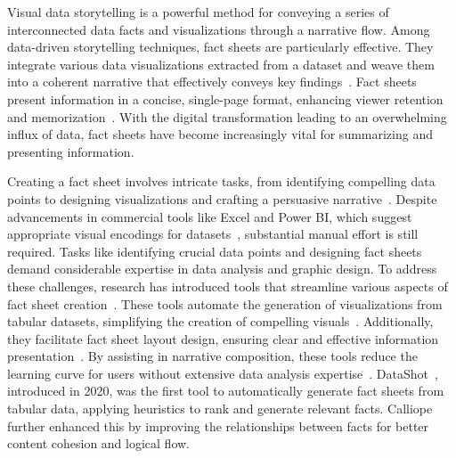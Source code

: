 
\maketitle

Visual data storytelling is a powerful method for conveying a series of interconnected data facts and visualizations through a narrative flow. Among data-driven storytelling techniques, fact sheets are particularly effective. They integrate various data visualizations extracted from a dataset and weave them into a coherent narrative that effectively conveys key findings~\cite{shi2020calliope}. Fact sheets present information in a concise, single-page format, enhancing viewer retention and memorization~\cite{wang2019datashot}. With the digital transformation leading to an overwhelming influx of data, fact sheets have become increasingly vital for summarizing and presenting information.
 

Creating a fact sheet involves intricate tasks, from identifying compelling data points to designing visualizations and crafting a persuasive narrative~\cite{ryan2018visual}. Despite advancements in commercial tools like Excel and Power BI, which suggest appropriate visual encodings for datasets~\cite{becker2019microsoft}, substantial manual effort is still required. Tasks like identifying crucial data points and designing fact sheets demand considerable expertise in data analysis and graphic design. To address these challenges, research has introduced tools that streamline various aspects of fact sheet creation~\cite{wu2021ai4vis}. These tools automate the generation of visualizations from tabular datasets, simplifying the creation of compelling visuals~\cite{dibia2018data2vis}. Additionally, they facilitate fact sheet layout design, ensuring clear and effective information presentation~\cite{cui2019datasite, wang2019datashot}. By assisting in narrative composition, these tools reduce the learning curve for users without extensive data analysis expertise~\cite{shi2020calliope}. DataShot~\cite{wang2019datashot}, introduced in 2020, was the first tool to automatically generate fact sheets from tabular data, applying heuristics to rank and generate relevant facts. Calliope~\cite{shi2020calliope} further enhanced this by improving the relationships between facts for better content cohesion and logical flow.

